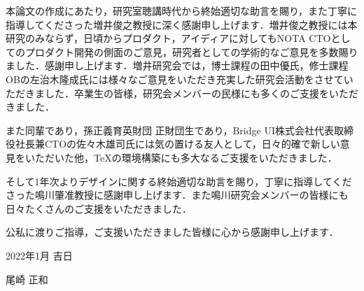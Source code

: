 \begin{acknowledgment}

本論文の作成にあたり，研究室聴講時代から終始適切な助言を賜り，また丁寧に指導してくださった増井俊之教授に深く感謝申し上げます．増井俊之教授には本研究のみならず，日頃からプロダクト，アイディアに対してもNOTA CTOとしてのプロダクト開発の側面のご意見，研究者としての学術的なご意見を多数賜りました．感謝申し上げます．増井研究会では，博士課程の田中優氏，修士課程OBの左治木隆成氏には様々なご意見をいただき充実した研究会活動をさせていただきました．卒業生の皆様，研究会メンバーの民様にも多くのご支援をいただきました．

また同輩であり，孫正義育英財団\cite{masason} 正財団生であり，Bridge UI株式会社\cite{bridgeui}代表取締役社長兼CTOの佐々木雄司氏には気の置ける友人として，日々的確で新しい意見をいただいた他，\TeX の環境構築にも多大なるご支援をいただきました．

そして1年次よりデザインに関する終始適切な助言を賜り，丁寧に指導してくださった鳴川肇准教授に感謝申し上げます．また鳴川研究会メンバーの皆様にも日々たくさんのご支援をいただきました．

公私に渡りご指導，ご支援いただきました皆様に心から感謝申し上げます．
\begin{flushright}
2022年1月 吉日

尾崎 正和
\end{flushright}
\end{acknowledgment}

